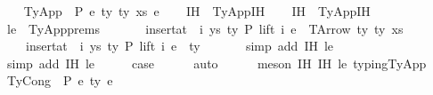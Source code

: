 \begin{isabellebody}
\isanewline
{}\isamarkupfalse%
\isanewline
\ \ \isamarkupfalse%
\ {\isacharparenleft}{\kern0pt}TyApp\ {\isasymGamma}\ P\ e{}\ ty{}\ ty{}\ xs\ e{}{\isacharparenright}{\kern0pt}\isanewline
\ \ \isamarkupfalse%
\ IH{}\ {\isacharequal}{\kern0pt}\ TyApp{\isachardot}{\kern0pt}IH{\isacharparenleft}{\kern0pt}{}{\isacharparenright}{\kern0pt}\isanewline
\ \ \isamarkupfalse%
\ IH{}\ {\isacharequal}{\kern0pt}\ TyApp{\isachardot}{\kern0pt}IH{\isacharparenleft}{\kern0pt}{}{\isacharparenright}{\kern0pt}\isanewline
\ \ \isamarkupfalse%
\ le\ {\isacharequal}{\kern0pt}\ TyApp{\isachardot}{\kern0pt}prems\isanewline
\isanewline
\ \ \isamarkupfalse%
\isanewline
\ \ \ \ {\isachardoublequoteopen}insert{\isacharunderscore}{\kern0pt}at\ {\isasymGamma}\ i\ {\isacharparenleft}{\kern0pt}ys{\isacharcomma}{\kern0pt}\ ty{}{\isacharprime}{\kern0pt}{\isacharparenright}{\kern0pt}\ {\isasymturnstile}{\isacharbraceleft}{\kern0pt}P{\isacharbraceright}{\kern0pt}\ lift\ i\ e{}\ {\isacharcolon}{\kern0pt}\ TArrow\ ty{}\ ty{}\ xs{\isachardoublequoteclose}\isanewline
\ \ \ \ {\isachardoublequoteopen}insert{\isacharunderscore}{\kern0pt}at\ {\isasymGamma}\ i\ {\isacharparenleft}{\kern0pt}ys{\isacharcomma}{\kern0pt}\ ty{}{\isacharprime}{\kern0pt}{\isacharparenright}{\kern0pt}\ {\isasymturnstile}{\isacharbraceleft}{\kern0pt}P{\isacharbraceright}{\kern0pt}\ lift\ i\ e{}\ {\isacharcolon}{\kern0pt}\ ty{}{\isachardoublequoteclose}\isanewline
\ \ \ \ \ \isamarkupfalse%
\ {\isacharparenleft}{\kern0pt}simp\ add{\isacharcolon}{\kern0pt}\ IH{}\ le{\isacharparenright}{\kern0pt}\isanewline
\ \ \ \ \ \isamarkupfalse%
\ {\isacharparenleft}{\kern0pt}simp\ add{\isacharcolon}{\kern0pt}\ IH{}\ le{\isacharparenright}{\kern0pt}\isanewline
\isanewline
\ \ \isamarkupfalse%
\ \isamarkupfalse%
\ {\isacharquery}{\kern0pt}case\isanewline
\ \ \ \ \isamarkupfalse%
\ auto\isanewline
\ \ \ \ \isamarkupfalse%
\ {\isacharparenleft}{\kern0pt}meson\ IH{}\ IH{}\ le\ typing{\isachardot}{\kern0pt}TyApp{\isacharparenright}{\kern0pt}\isanewline
\isanewline
{}\isamarkupfalse%
\isanewline
\ \ \isamarkupfalse%
\ {\isacharparenleft}{\kern0pt}TyCong\ {\isasymGamma}\ P\ e{}\ ty\ e{}{\isacharparenright}{\kern0pt}\isanewline

\end{isabellebody}
